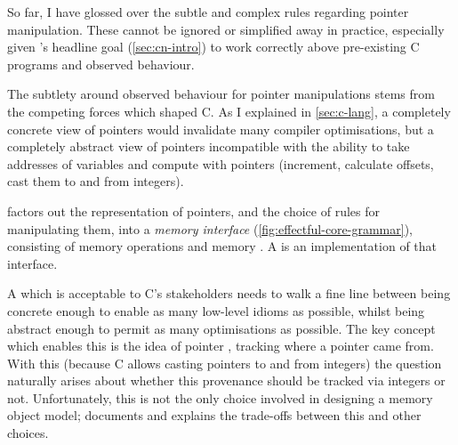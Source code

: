 
So far, I have glossed over the subtle and complex rules regarding
pointer manipulation. These cannot be ignored or simplified away in practice,
especially given 's headline goal (\cref{sec:cn-intro}) to work
correctly above pre-existing C programs and observed behaviour.

The subtlety around observed behaviour for pointer manipulations stems from the
competing forces which shaped C. As I
explained in \cref{sec:c-lang}, a completely concrete view of pointers would
invalidate many compiler optimisations, but a completely abstract view of
pointers incompatible with the ability to take addresses of variables and
compute with pointers (increment, calculate offsets, cast them to and from
integers).

 factors out the representation of pointers, and the choice of
rules for manipulating them, into a \emph{memory interface}
(\cref{fig:effectful-core-grammar}), consisting of memory operations
 and memory . A  is an implementation of that interface.

A  which is acceptable to C's stakeholders
needs to walk a fine line between being concrete enough to enable as many
low-level idioms as possible, whilst being abstract enough to permit as many
optimisations as possible. The key concept which enables this is the idea of
pointer , tracking where a pointer came from. With this
(because C allows casting pointers to and from integers) the question naturally
arises about whether this provenance should be tracked via integers or not.
Unfortunately, this is not the only choice involved in designing a
memory object model;  documents
and explains the trade-offs between this and other choices.


